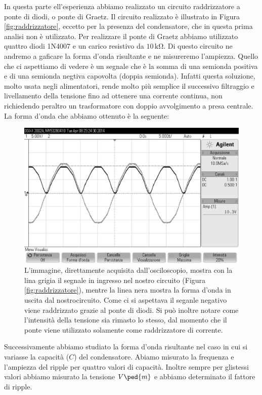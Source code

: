 In questa parte ell'esperienza abbiamo realizzato un circuito raddrizzatore a ponte di diodi, o ponte di Graetz. Il circuito realizzato è illustrato in Figura \ref{fig:raddrizzatore}, eccetto per la presenza del condensatore, che in questa prima analisi non è utilizzato.
Per realizzare il ponte di Graetz abbiamo utilizzato quattro diodi 1N4007 e un carico resistivo da $10\,\si{\kilo\ohm}$. Di questo circuito ne andremo a gaficare la forma d'onda risultante e ne misureremo l'ampiezza.
Quello che ci aspettiamo di vedere è un segnale che è la somma di una semionda positiva e di una semionda negtiva capovolta (doppia semionda).
Infatti questa soluzione, molto usata negli alimentatori, rende molto più semplice il successivo filtraggio e livellamento della tensione fino ad ottenere una corrente continua, non richiedendo peraltro un trasformatore con doppio avvolgimento a presa centrale.
La forma d'onda che abbiamo ottenuto è la seguente:

\begin{figure}
    \includegraphics[scale=0.5]{n2_bianco.pdf}
    \caption{L'immagine, direttamente acquisita dall'osciloscopio, mostra con la lina grigia il segnale in ingresso nel nostro circuito (Figura \ref{fig:raddrizzatore}), mentre la linea nera mostra la forma d'onda in uscita dal nostrocircuito. Come ci si aspettava il seganle negativo viene raddrizzato grazie al ponte di diodi. Si può inoltre notare come l'intensità della tensione sia rimasto lo stesso, dal momento che il ponte viene utilizzato solamente come raddrizzatore di corrente.}
    \label{fig:graetz2}
\end{figure}

Successivamente abbiamo studiato la forma d'onda risultante nel caso in cui si variasse la capacità ($C$) del condensatore. Abiamo misurato la frequenza e l'ampiezza del ripple per quattro valori di capacità. Inoltre sempre per glistessi valori abbiamo misurato la tensione $V\ped{m}$ e abbiamo determinato il fattore di ripple.

